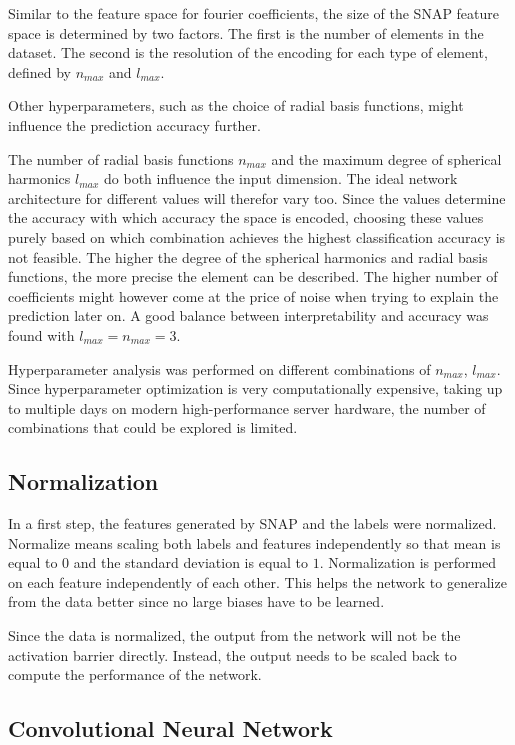 Similar to the feature space for fourier coefficients, the size of the SNAP feature space is determined by two factors.
The first is the number of elements in the dataset.
The second is the resolution of the encoding for each type of element, defined by $n_{max}$ and $l_{max}$.

Other hyperparameters, such as the choice of radial basis functions, might influence the prediction accuracy further.

The number of radial basis functions $n_{max}$ and the maximum degree of spherical harmonics $l_{max}$ do both influence
the input dimension.
The ideal network architecture for different values will therefor vary too.
Since the values determine the accuracy with which accuracy the space is encoded, choosing these values purely 
based on which combination achieves the highest classification accuracy is not feasible.
The higher the degree of the spherical harmonics and radial basis functions, the more precise the element can be described.
The higher number of coefficients might however come at the price of noise when trying to explain the prediction later on.
A good balance between interpretability and accuracy was found with $l_{max}=n_{max}=3$. %

Hyperparameter analysis was performed on different combinations of $n_{max}$, $l_{max}$.
Since hyperparameter optimization is very computationally expensive, taking up to multiple days on modern high-performance 
server hardware, the number of combinations that could be explored is limited.

\subsection{Normalization}

In a first step, the features generated by SNAP and the labels were normalized.
Normalize means scaling both labels and features independently so that mean is equal to $0$ and the standard deviation is equal to $1$.
Normalization is performed on each feature independently of each other.
This helps the network to generalize from the data better since no large biases have to be learned.

Since the data is normalized, the output from the network will not be the activation barrier directly.
Instead, the output needs to be scaled back to compute the performance of the network.

\subsection{Convolutional Neural Network}

